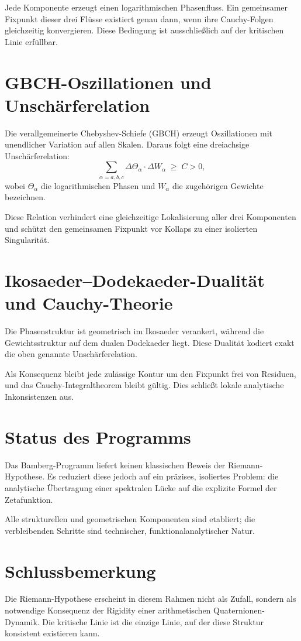 \documentclass[11pt]{article}
\begin{document}
Jede Komponente erzeugt einen logarithmischen Phasenfluss.
Ein gemeinsamer Fixpunkt dieser drei Flüsse existiert genau dann,
wenn ihre Cauchy-Folgen gleichzeitig konvergieren.
Diese Bedingung ist ausschließlich auf der kritischen Linie erfüllbar.

\section{GBCH-Oszillationen und Unschärferelation}

Die verallgemeinerte Chebyshev-Schiefe (GBCH) erzeugt Oszillationen
mit unendlicher Variation auf allen Skalen.
Daraus folgt eine dreiachsige Unschärferelation:
\[
\sum_{\alpha=a,b,c}
\Delta \Theta_\alpha \cdot \Delta W_\alpha \;\ge\; C > 0,
\]
wobei $\Theta_\alpha$ die logarithmischen Phasen
und $W_\alpha$ die zugehörigen Gewichte bezeichnen.

Diese Relation verhindert eine gleichzeitige Lokalisierung
aller drei Komponenten und schützt den gemeinsamen Fixpunkt
vor Kollaps zu einer isolierten Singularität.

\section{Ikosaeder--Dodekaeder-Dualität und Cauchy-Theorie}

Die Phasenstruktur ist geometrisch im Ikosaeder verankert,
während die Gewichtsstruktur auf dem dualen Dodekaeder liegt.
Diese Dualität kodiert exakt die oben genannte Unschärferelation.

Als Konsequenz bleibt jede zulässige Kontur um den Fixpunkt
frei von Residuen, und das Cauchy-Integraltheorem bleibt gültig.
Dies schließt lokale analytische Inkonsistenzen aus.

\section{Status des Programms}

Das Bamberg-Programm liefert keinen klassischen Beweis der Riemann-Hypothese.
Es reduziert diese jedoch auf ein präzises, isoliertes Problem:
die analytische Übertragung einer spektralen Lücke
auf die explizite Formel der Zetafunktion.

Alle strukturellen und geometrischen Komponenten sind etabliert;
die verbleibenden Schritte sind technischer, funktionalanalytischer Natur.

\section{Schlussbemerkung}

Die Riemann-Hypothese erscheint in diesem Rahmen nicht als Zufall,
sondern als notwendige Konsequenz der Rigidity
einer arithmetischen Quaternionen-Dynamik.
Die kritische Linie ist die einzige Linie,
auf der diese Struktur konsistent existieren kann.
\end{document}
